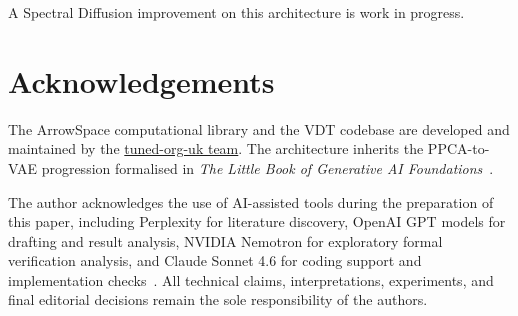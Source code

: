 \documentclass[11pt,a4paper]{article}
\begin{document}
A Spectral Diffusion improvement on this architecture is work in progress.

\section*{Acknowledgements}

The ArrowSpace computational library and the VDT codebase are developed and
maintained by the \href{https://github.com/sponsors/tuned-org-uk}{tuned-org-uk team}.
The architecture inherits the PPCA-to-VAE progression formalised in
\emph{The Little Book of Generative AI Foundations}~\cite{chen2026}.

The author acknowledges the use of AI-assisted tools during the preparation of this paper, including Perplexity for literature discovery, OpenAI GPT models for drafting and result analysis, NVIDIA Nemotron for exploratory formal verification analysis, and Claude Sonnet 4.6 for coding support and implementation checks~\cite{perplexity,openai_gpt5,nvidia_nemotron,anthropic_claude46}. All technical claims, interpretations, experiments, and final editorial decisions remain the sole responsibility of the authors.

\newpage
\end{document}
